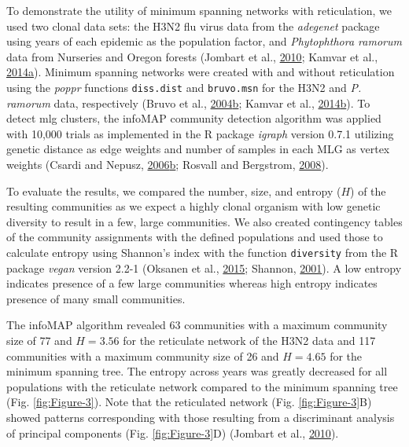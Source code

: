 \documentclass[double,12pt]{beavtex}
\begin{document}
  To demonstrate the utility of minimum spanning networks with
  reticulation, we used two clonal data sets: the H3N2 flu virus data from
  the \emph{adegenet} package using years of each epidemic as the
  population factor, and \emph{Phytophthora ramorum} data from Nurseries
  and Oregon forests (Jombart et al.,
  \protect\hyperlink{ref-jombart2010discriminant}{2010}; Kamvar et al.,
  \protect\hyperlink{ref-kamvar2014sudden}{2014}\protect\hyperlink{ref-kamvar2014sudden}{a}).
  Minimum spanning networks were created with and without reticulation
  using the \emph{poppr} functions \texttt{diss.dist} and
  \texttt{bruvo.msn} for the H3N2 and \emph{P. ramorum} data, respectively
  (Bruvo et al.,
  \protect\hyperlink{ref-bruvo2004simple}{2004}\protect\hyperlink{ref-bruvo2004simple}{b};
  Kamvar et al.,
  \protect\hyperlink{ref-kamvar2014poppr}{2014}\protect\hyperlink{ref-kamvar2014poppr}{b}).
  To detect mlg clusters, the infoMAP community detection algorithm was
  applied with 10,000 trials as implemented in the R package \emph{igraph}
  version 0.7.1 utilizing genetic distance as edge weights and number of
  samples in each MLG as vertex weights (Csardi and Nepusz,
  \protect\hyperlink{ref-csardi2006igraph}{2006}\protect\hyperlink{ref-csardi2006igraph}{b};
  Rosvall and Bergstrom, \protect\hyperlink{ref-rosvall2008maps}{2008}).
  
  To evaluate the results, we compared the number, size, and entropy
  (\(H\)) of the resulting communities as we expect a highly clonal
  organism with low genetic diversity to result in a few, large
  communities. We also created contingency tables of the community
  assignments with the defined populations and used those to calculate
  entropy using Shannon's index with the function \texttt{diversity} from
  the R package \emph{vegan} version 2.2-1 (Oksanen et al.,
  \protect\hyperlink{ref-oksanen2015vegan}{2015}; Shannon,
  \protect\hyperlink{ref-shannon2001mathematical}{2001}). A low entropy
  indicates presence of a few large communities whereas high entropy
  indicates presence of many small communities.
  
  The infoMAP algorithm revealed 63 communities with a maximum community
  size of 77 and \(H = 3.56\) for the reticulate network of the H3N2 data
  and 117 communities with a maximum community size of 26 and \(H = 4.65\)
  for the minimum spanning tree. The entropy across years was greatly
  decreased for all populations with the reticulate network compared to
  the minimum spanning tree (Fig. \ref{fig:Figure-3}). Note that the
  reticulated network (Fig. \ref{fig:Figure-3}B) showed patterns
  corresponding with those resulting from a discriminant analysis of
  principal components (Fig. \ref{fig:Figure-3}D) (Jombart et al.,
  \protect\hyperlink{ref-jombart2010discriminant}{2010}).
  
\end{document}
